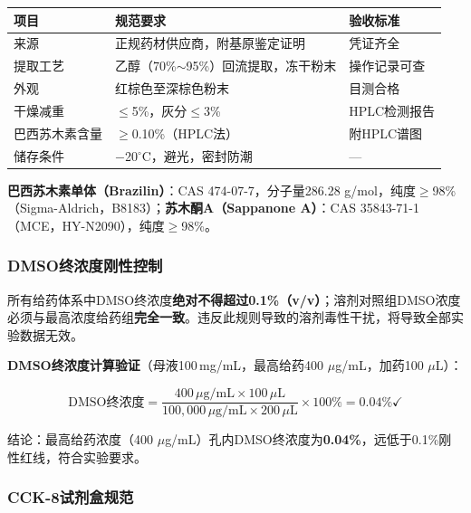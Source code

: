 \documentclass[12pt,a4paper]{article}
\newcommand{\um}{\,$\mu$g/mL}
\newcommand{\degC}{$^\circ$C}
\newcommand{\uul}{\,$\mu$L}
\begin{document}
\begin{center}
\begin{tabular}{lll}
\toprule
\rowcolor{tabheadbg}\color{white}\textbf{项目} & \color{white}\textbf{规范要求} & \color{white}\textbf{验收标准} \\
\midrule
来源 & 正规药材供应商，附基原鉴定证明 & 凭证齐全 \\
提取工艺 & 乙醇（70\%$\sim$95\%）回流提取，冻干粉末 & 操作记录可查 \\
外观 & 红棕色至深棕色粉末 & 目测合格 \\
干燥减重 & $\leq$5\%，灰分$\leq$3\% & HPLC检测报告 \\
巴西苏木素含量 & $\geq$0.10\%（HPLC法）& 附HPLC谱图 \\
储存条件 & $-$20\degC{}，避光，密封防潮 & — \\
\bottomrule
\end{tabular}
\end{center}

\textbf{巴西苏木素单体（Brazilin）}：CAS 474-07-7，分子量286.28 g/mol，纯度$\geq$98\%（Sigma-Aldrich，B8183）；\textbf{苏木酮A（Sappanone A）}：CAS 35843-71-1（MCE，HY-N2090），纯度$\geq$98\%。

\subsubsection{DMSO终浓度刚性控制}

\begin{warningbox}
所有给药体系中DMSO终浓度\textbf{绝对不得超过0.1\%（v/v）}；溶剂对照组DMSO浓度必须与最高浓度给药组\textbf{完全一致}。违反此规则导致的溶剂毒性干扰，将导致全部实验数据无效。
\end{warningbox}

\textbf{DMSO终浓度计算验证}（母液100\,mg/mL，最高给药400\,\um{}，加药100\,\uul{}）：

\[
\text{DMSO终浓度} = \frac{400\,\mu\text{g/mL} \times 100\,\mu\text{L}}{100{,}000\,\mu\text{g/mL} \times 200\,\mu\text{L}} \times 100\% = 0.04\% \checkmark
\]

结论：最高给药浓度（400\,\um{}）孔内DMSO终浓度为\textbf{0.04\%}，远低于0.1\%刚性红线，符合实验要求\cite{ref23,ref25}。

\subsubsection{CCK-8试剂盒规范}
\end{document}
